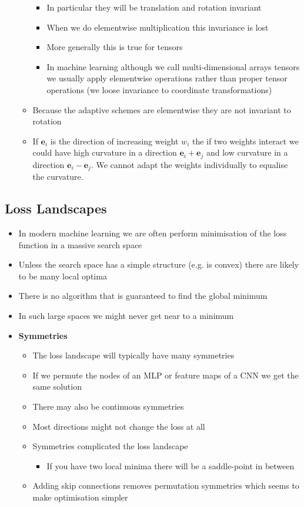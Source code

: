 \documentclass[11pt]{article}
\begin{document}
\begin{itemize}
\begin{itemize}
\begin{itemize}
\item In particular they will be translation and rotation invariant
\item When we do elementwise multiplication this invariance is lost
\item More generally this is true for tensors
\item In machine learning although we call multi-dimensional arrays
tensors we usually apply elementwise operations rather than
proper tensor operations (we loose invariance to coordinate
transformations)
\end{itemize}
\item Because the adaptive schemes are elementwise they are not
invariant to rotation
\item If \(\bm{e}_i\) is the direction of increasing weight \(w_i\) the
if two weights interact we could have high curvature in a
direction \(\bm{e}_i+\bm{e}_j\) and low curvature in a direction
\(\bm{e}_i-\bm{e}_j\).  We cannot adapt the weights individually
to equalise the curvature.
\end{itemize}
\end{itemize}

\subsection{Loss Landscapes}
\label{sec:org86a2bff}
\begin{itemize}
\item In modern machine learning we are often perform minimisation of
the loss function in a massive search space
\item Unless the search space has a simple structure (e.g. is convex)
there are likely to be many local optima
\item There is no algorithm that is guaranteed to find the global minimum
\item In such large spaces we might never get near to a minimum
\item \textbf{Symmetries}
\begin{itemize}
\item The loss landscape will typically have many symmetries
\item If we permute the nodes of an MLP or feature maps of a CNN we
get the same solution
\item There may also be continuous symmetries
\item Most directions might not change the loss at all
\item Symmetries complicated the loss landscape
\begin{itemize}
\item If you have two local minima there will be a saddle-point in
between
\end{itemize}
\item Adding skip connections removes permutation symmetries which
seems to make optimisation simpler
\end{itemize}
\end{itemize}
\end{document}
